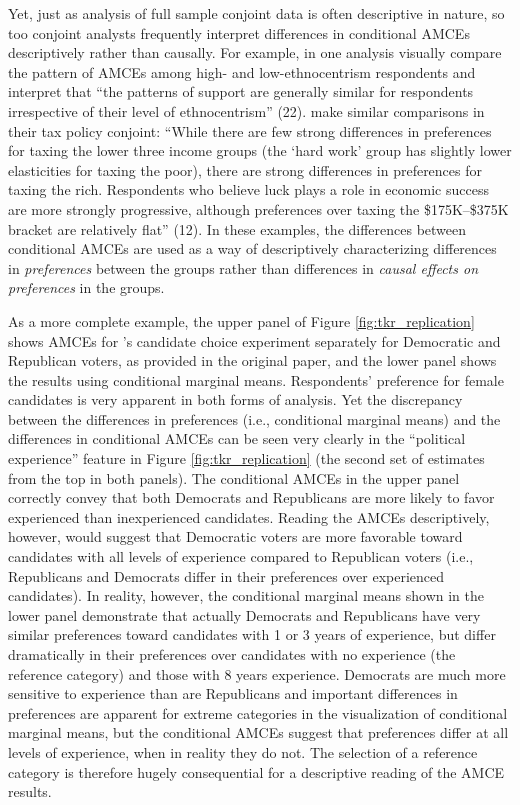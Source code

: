 \documentclass[a4paper,12pt]{article}\usepackage[]{graphicx}\usepackage[]{color}
\begin{document}
Yet, just as analysis of full sample conjoint data is often descriptive in nature, so too conjoint analysts frequently interpret differences in conditional AMCEs descriptively rather than causally. For example, in one analysis \citet{HainmuellerHopkinsYamamoto2014} visually compare the pattern of AMCEs among high- and low-ethnocentrism respondents and interpret that ``the patterns of support are generally similar for respondents irrespective of their level of ethnocentrism'' (22). \citet{BallardRosaMartinScheve2016} make similar comparisons in their tax policy conjoint: ``While there are few strong differences in preferences for taxing the lower three income groups (the `hard work' group has slightly lower elasticities for taxing the poor), there are strong differences in preferences for taxing the rich. Respondents who believe luck plays a role in economic success are more strongly progressive, although preferences over taxing the \$175K--\$375K bracket are relatively flat'' (12). In these examples, the differences between conditional AMCEs are used as a way of descriptively characterizing differences in \textit{preferences} between the groups rather than differences in \textit{causal effects on preferences} in the groups.

As a more complete example, the upper panel of Figure \ref{fig:tkr_replication} shows AMCEs for \citeauthor{TeeleKallaRosenbluth2018}'s candidate choice experiment separately for Democratic and Republican voters, as provided in the original paper, and the lower panel shows the results using conditional marginal means. Respondents' preference for female candidates is very apparent in both forms of analysis. Yet the discrepancy between the differences in preferences (i.e., conditional marginal means) and the differences in conditional AMCEs can be seen very clearly in the ``political experience'' feature in Figure \ref{fig:tkr_replication} (the second set of estimates from the top in both panels). The conditional AMCEs in the upper panel correctly convey that both Democrats and Republicans are more likely to favor experienced than inexperienced candidates. Reading the AMCEs descriptively, however, would suggest that Democratic voters are more favorable toward candidates with all levels of experience compared to Republican voters (i.e., Republicans and Democrats differ in their preferences over experienced candidates). In reality, however, the conditional marginal means shown in the lower panel demonstrate that actually Democrats and Republicans have very similar preferences toward candidates with 1 or 3 years of experience, but differ dramatically in their preferences over candidates with no experience (the reference category) and those with 8 years experience. Democrats are much more sensitive to experience than are Republicans and important differences in preferences are apparent for extreme categories in the visualization of conditional marginal means, but the conditional AMCEs suggest that preferences differ at all levels of experience, when in reality they do not. The selection of a reference category is therefore hugely consequential for a descriptive reading of the AMCE results.
\end{document}
